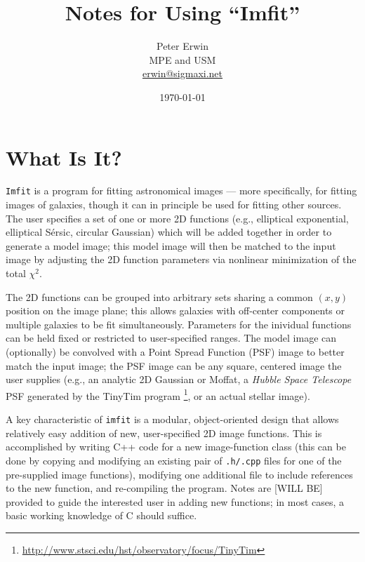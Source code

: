 \documentclass[10pt]{article}
\newcommand{\imfit}{\texttt{imfit}}
\newcommand{\Imfit}{\texttt{Imfit}}
\begin{document}
\title{
  Notes for Using ``Imfit''
}
\author{
  Peter Erwin\\
  MPE and USM\\
  \href{mailto:erwin@sigmaxi.net}{erwin@sigmaxi.net}
}
\date{\today}  %

\maketitle

\tableofcontents


\section{What Is It?}

\Imfit{} is a program for fitting astronomical images --- more
specifically, for fitting images of galaxies, though it can in principle
be used for fitting other sources. The user specifies a set of one or
more 2D functions (e.g., elliptical exponential, elliptical S\'ersic,
circular Gaussian) which will be added together in order to generate a
model image; this model image will then be matched to the input image by
adjusting the 2D function parameters via nonlinear minimization of the total
$\chi^2$.

The 2D functions can be grouped into arbitrary sets sharing a common $(x,y)$
position on the image plane; this allows galaxies with off-center components
or multiple galaxies to be fit simultaneously. Parameters for the inividual
functions can be held fixed or restricted to user-specified ranges. The
model image can (optionally) be convolved with a Point Spread
Function (PSF) image to better match the input image; the PSF image can
be any square, centered image the user supplies (e.g., an analytic 2D Gaussian
or Moffat, a \textit{Hubble Space Telescope} PSF generated by the TinyTim
program \cite{krist95}\footnote{\url{http://www.stsci.edu/hst/observatory/focus/TinyTim}}, 
or an actual stellar image).

A key characteristic of \imfit{} is a modular, object-oriented design
that allows relatively easy addition of new, user-specified 2D image
functions. This is accomplished by writing C++ code for a new
image-function class (this can be done by copying and modifying an
existing pair of \texttt{.h/.cpp} files for one of the pre-supplied
image functions), modifying one additional file to include references to
the new function, and re-compiling the program. Notes are [WILL BE] provided
to guide the interested user in adding new functions; in most cases, a
basic working knowledge of C should suffice.
\end{document}
